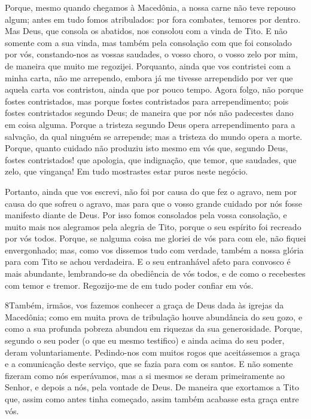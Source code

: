 Porque, mesmo quando chegamos à Macedônia, a nossa carne não teve
repouso algum; antes em tudo fomos atribulados: por fora combates,
temores por dentro. Mas Deus, que consola os abatidos, nos
consolou com a vinda de Tito. E não somente com a sua vinda, mas
também pela consolação com que foi consolado por vós, constando-nos
as vossas saudades, o vosso choro, o vosso zelo por mim, de maneira
que muito me regozijei. Porquanto, ainda que vos contristei com
a minha carta, não me arrependo, embora já me tivesse arrependido
por ver que aquela carta vos contristou, ainda que por pouco tempo.
Agora folgo, não porque fostes contristados, mas porque fostes
contristados para arrependimento; pois fostes contristados segundo
Deus; de maneira que por nós não padecestes dano em coisa alguma.
Porque a tristeza segundo Deus opera arrependimento para a
salvação, da qual ninguém se arrepende; mas a tristeza do mundo
opera a morte. Porque, quanto cuidado não produziu isto mesmo
em vós que, segundo Deus, fostes contristados! que apologia, que
indignação, que temor, que saudades, que zelo, que vingança! Em tudo
mostrastes estar puros neste negócio.

Portanto, ainda que vos escrevi, não foi por causa do que fez o
agravo, nem por causa do que sofreu o agravo, mas para que o vosso
grande cuidado por nós fosse manifesto diante de Deus. Por
isso fomos consolados pela vossa consolação, e muito mais nos
alegramos pela alegria de Tito, porque o seu espírito foi recreado
por vós todos. Porque, se nalguma coisa me gloriei de vós
para com ele, não fiquei envergonhado; mas, como vos dissemos tudo
com verdade, também a nossa glória para com Tito se achou
verdadeira. E o seu entranhável afeto para convosco é mais
abundante, lembrando-se da obediência de vós todos, e de como o
recebestes com temor e tremor. Regozijo-me de em tudo poder
confiar em vós.

\medskip

\lettrine{8} Também, irmãos, vos fazemos conhecer a graça de
Deus dada às igrejas da Macedônia; como em muita prova de
tribulação houve abundância do seu gozo, e como a sua profunda
pobreza abundou em riquezas da sua generosidade. Porque, segundo
o seu poder (o que eu mesmo testifico) e ainda acima do seu poder,
deram voluntariamente. Pedindo-nos com muitos rogos que
aceitássemos a graça e a comunicação deste serviço, que se fazia
para com os santos. E não somente fizeram como nós esperávamos,
mas a si mesmos se deram primeiramente ao Senhor, e depois a nós,
pela vontade de Deus. De maneira que exortamos a Tito que, assim
como antes tinha começado, assim também acabasse esta graça entre
vós.

